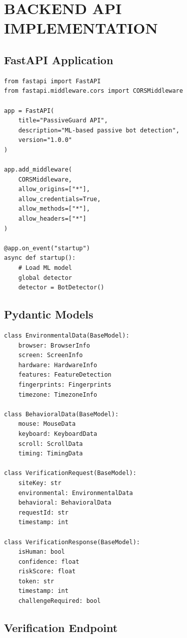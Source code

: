 \section{BACKEND API IMPLEMENTATION}

\subsection{FastAPI Application}

\begin{verbatim}
from fastapi import FastAPI
from fastapi.middleware.cors import CORSMiddleware

app = FastAPI(
    title="PassiveGuard API",
    description="ML-based passive bot detection",
    version="1.0.0"
)

app.add_middleware(
    CORSMiddleware,
    allow_origins=["*"],
    allow_credentials=True,
    allow_methods=["*"],
    allow_headers=["*"]
)

@app.on_event("startup")
async def startup():
    # Load ML model
    global detector
    detector = BotDetector()
\end{verbatim}

\subsection{Pydantic Models}

\begin{verbatim}
class EnvironmentalData(BaseModel):
    browser: BrowserInfo
    screen: ScreenInfo
    hardware: HardwareInfo
    features: FeatureDetection
    fingerprints: Fingerprints
    timezone: TimezoneInfo

class BehavioralData(BaseModel):
    mouse: MouseData
    keyboard: KeyboardData
    scroll: ScrollData
    timing: TimingData

class VerificationRequest(BaseModel):
    siteKey: str
    environmental: EnvironmentalData
    behavioral: BehavioralData
    requestId: str
    timestamp: int

class VerificationResponse(BaseModel):
    isHuman: bool
    confidence: float
    riskScore: float
    token: str
    timestamp: int
    challengeRequired: bool
\end{verbatim}

\subsection{Verification Endpoint}

